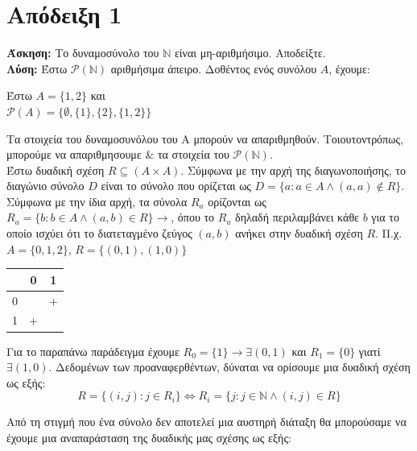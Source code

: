\documentclass[]{article}
\title{}
\author{}
\begin{document}
\maketitle

\begin{abstract}

\end{abstract}
\section{Απόδειξη 1}
\textbf{Άσκηση:} Το δυναμοσύνολο του $\mathbb{N}$ είναι μη-αριθμήσιμο.
Αποδείξτε.\\
\textbf{Λύση:} Έστω $\mathcal{P}(\mathbb{N})$ αριθμήσιμα άπειρο. Δοθέντος ενός συνόλου $A$, έχουμε:
\begin{center}
	Έστω $A = \{1, 2\}$ και\\
	$\mathcal{P}(A) = \{\emptyset, \{1\}, \{2\}, \{1, 2\}\}$\\
\end{center}
Τα στοιχεία του δυναμοσυνόλου του Α μπορούν να απαριθμηθούν. Τοιουτοντρόπως, μπορούμε να απαριθμησουμε \& τα στοιχεία του $\mathcal{P}(\mathbb{N})$. \\
Έστω δυαδική σχέση $R \subseteq (A \times A)$. Σύμφωνα με την αρχή της διαγωνοποιήσης, το διαγώνιο σύνολο $D$ είναι το σύνολο που ορίζεται ως
$D = \{a : a \in A \land (a,a) \notin R\}$. Σύμφωνα με την ίδια αρχή, τα σύνολα $R_a$ ορίζονται ως
$R_a = \{b : b \in A \land (a,b) \in R\} \rightarrow$, όπου το $R_a$ δηλαδή περιλαμβάνει κάθε $b$ για το οποίο ισχύει ότι το διατεταγμένο ζεύγος $(a,b)$ ανήκει στην δυαδική σχέση $R$. Π.χ.
$A = \{0, 1, 2\}$, $R = \{(0, 1), (1, 0)\}$
\begin{center}
	\begin{tabular}{c|cc}
		& 0 & 1 \\ \hline
		0 &   & + \\ \hline
		1 & + &   
	\end{tabular}
\end{center}
Για το παραπάνω παράδειγμα έχουμε $R_0 = \{1\} \rightarrow \exists (0,1)$ και $R_1 = \{0\}$ γιατί $\exists (1,0)$. Δεδομένων των προαναφερθέντων, δύναται να ορίσουμε μια δυαδική σχέση ως εξής:
\begin{equation}
R = \{(i,j) : j \in R_i\} \iff R_i = \{j : j \in \mathbb{N} \land (i,j) \in R\}
\end{equation}

Από τη στιγμή που ένα σύνολο δεν αποτελεί μια αυστηρή διάταξη θα μπορούσαμε να έχουμε μια αναπαράσταση της δυαδικής μας σχέσης ως εξής:
\end{document}
